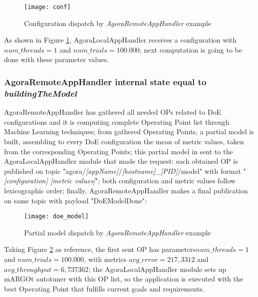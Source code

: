 \begin{figure}[H]

    \centering
    \texttt{[image: conf]}
    \caption{Configuration dispatch by \textit{AgoraRemoteAppHandler} example}
    \label{fig:conf}
    
\end{figure}

As shown in Figure \ref{fig:conf}, AgoraLocalAppHandler receives a configuration with $num\_threads = 1$ and $num\_trials = 100.000$; next computation is going to be done with these parameter values.


\subsubsection{AgoraRemoteAppHandler internal state equal to \textit{building\-The\-Model}}\label{DoEModelSend}

AgoraRemoteAppHandler has gathered all needed OPs related to DoE configurations and it is computing complete Operating Point list through Machine Learning techniques; from gathered Operating Points, a partial model is built, assembling to every DoE configuration the mean of metric values, taken from the corresponding Operating Points; this partial model in sent to the Agora\-Local\-App\-Handler module that made the request: each obtained OP is published on topic "agora\slash{}\textit{[appName]}\slash{}\textit{[hostname]\_[PID]}\slash{}mod\-el" with format "\textit{[configuration] [metric values]}"; both configuration and metric values follow lexicographic order; finally, AgoraRemoteAppHandler makes a final publication on same topic with payload "DoEModelDone":

\begin{figure}[H]

    \centering
    \texttt{[image: doe\_model]}
    \caption{Partial model dispatch by \textit{AgoraRemoteAppHandler} example}
    \label{fig:doe_model}
    
\end{figure}

Taking Figure \ref{fig:doe_model} as reference, the first sent OP has parameters\linebreak $num\_threads = 1$ and $num\_trials = 100.000$, with metrics $avg\_error = 217,3312$ and $avg\_throughput = 6,737362$; the AgoraLocalAppHandler module sets up mARGOt autotuner with this OP list, so the application is executed with the best Operating Point that fulfills current goals and requirements.



